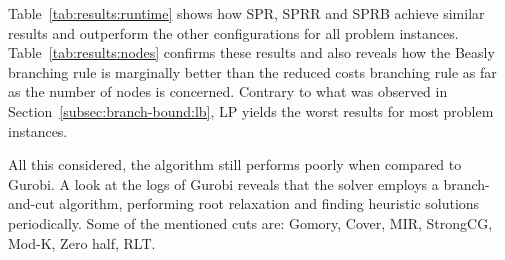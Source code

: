 \documentclass[runningheads]{llncs}
\begin{document}
Table~\ref{tab:results:runtime} shows how SPR, SPRR and SPRB achieve similar results and outperform the other configurations for all problem instances. Table~\ref{tab:results:nodes} confirms these results and also reveals how the Beasly branching rule is marginally better than the reduced costs branching rule as far as the number of nodes is concerned. Contrary to what was observed in Section~\ref{subsec:branch-bound:lb}, LP yields the worst results for most problem instances. 

All this considered, the algorithm still performs poorly when compared to Gurobi. A look at the logs of Gurobi reveals that the solver employs a branch-and-cut algorithm, performing root relaxation and finding heuristic solutions periodically. Some of the mentioned cuts are: Gomory, Cover, MIR, StrongCG, Mod-K, Zero half, RLT.
\end{document}

